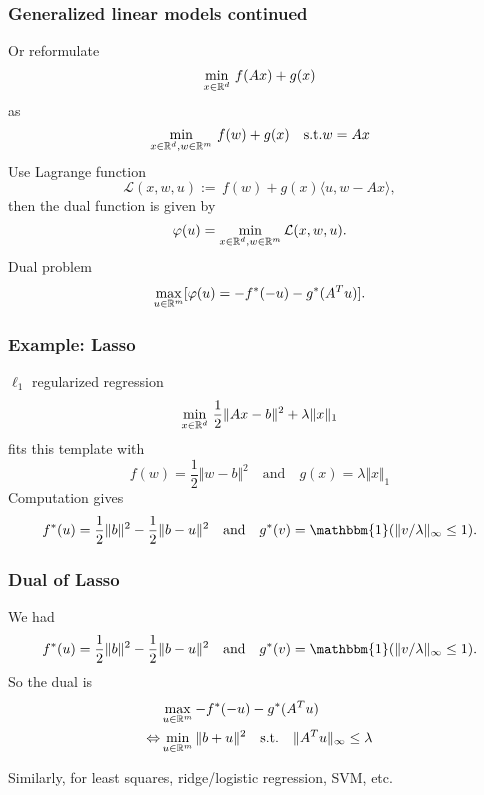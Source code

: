 \documentclass[aspectratio=149]{beamer}
\begin{document}
\begin{frame}
  \frametitle{Generalized linear models continued}
  Or reformulate
  \begin{equation}
    \min_{x\in \mathbb{R}^d} \, f(Ax) + g(x)
  \end{equation}
  as
  \begin{equation}
    \min_{x\in\mathbb{R}^d, w\in \mathbb{R}^m} \, f(w)+ g(x) \quad \text{s.t.} w = Ax
  \end{equation}
  Use Lagrange function
  \begin{equation}
    \mathcal{L}(x,w, u) :=  \, f(w)+ g(x) \langle u, w - Ax \rangle,
  \end{equation}
  then the dual function is given by
  \begin{equation}
    \varphi(u) = \min_{x\in\mathbb{R}^d, w\in \mathbb{R}^m} \mathcal{L}(x,w,u).
  \end{equation}
  Dual problem
  \begin{equation}
    \max_{u \in \mathbb{R}^m} [\varphi(u) = - f^*(-u) - g^*(A^T u)].
  \end{equation}
\end{frame}


\begin{frame}
  \frametitle{Example: Lasso}
  $\ell_1$ regularized regression
  \begin{equation}
    \min_{x\in \mathbb{R}^d}\, \frac12 \Vert Ax-b \Vert^2 + \lambda \Vert x \Vert_1
  \end{equation}
  fits this template with
  \begin{equation}
    f(w) = \frac12 \Vert w-b \Vert^2 \quad \text{and} \quad g(x) = \lambda \Vert x \Vert_1
  \end{equation}
  Computation gives
  \begin{equation}
    f^*(u) = \frac12 \Vert b \Vert^2 - \frac12 \Vert b-u \Vert^2 \quad \text{and} \quad g^*(v)= \mathbbm{1}(\Vert v/\lambda \Vert_\infty \le 1).
  \end{equation}
\end{frame}

\begin{frame}
  \frametitle{Dual of Lasso}
  We had
  \begin{equation}
    f^*(u) = \frac12 \Vert b \Vert^2 - \frac12 \Vert b-u \Vert^2 \quad \text{and} \quad g^*(v)= \mathbbm{1}(\Vert v/\lambda \Vert_\infty \le 1).
  \end{equation}
  So the dual is
  \begin{equation}
    \begin{aligned}
      &\max_{u\in \mathbb{R}^m} - f^*(-u) - g^*(A^T u) \\
      \Leftrightarrow& \min_{u\in\mathbb{R}^m} \Vert b+u \Vert^2 \quad \text{s.t.} \quad \Vert A^T u \Vert_{\infty} \le \lambda
    \end{aligned}
  \end{equation}

  Similarly, for least squares, ridge/logistic regression, SVM, etc.
\end{frame}
\end{document}
